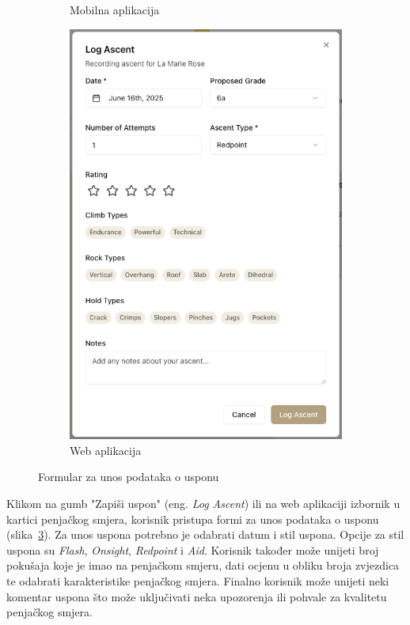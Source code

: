 \begin{figure}[H]
\begin{subfigure}[b]{0.38\textwidth}
        \caption{Mobilna aplikacija}
        \label{fig:formular_uspona_mob}
    \end{subfigure}
    \hfill
    \begin{subfigure}[b]{0.55\textwidth}
        \centering
        \includegraphics[width=\textwidth]{images/implementacija/web/route-details/log-ascent.png}
        \caption{Web aplikacija}
        \label{fig:formular_uspona_web}
    \end{subfigure}
    \caption{Formular za unos podataka o usponu}
    \label{fig:formular_uspona}
\end{figure}

Klikom na gumb "Zapiši uspon" (eng. \textit{Log Ascent}) ili na web aplikaciji izbornik u kartici penjačkog smjera, korisnik pristupa formi za unos podataka o usponu (slika~\ref{fig:formular_uspona}). Za unos uspona potrebno je odabrati datum i stil uspona. Opcije za stil uspona su \textit{Flash}, \textit{Onsight}, \textit{Redpoint} i \textit{Aid}. Korisnik također može unijeti broj pokušaja koje je imao na penjačkom smjeru, dati ocjenu u obliku broja zvjezdica te odabrati karakteristike penjačkog smjera. Finalno korisnik može unijeti neki komentar uspona što može uključivati neka upozorenja ili pohvale za kvalitetu penjačkog smjera.


